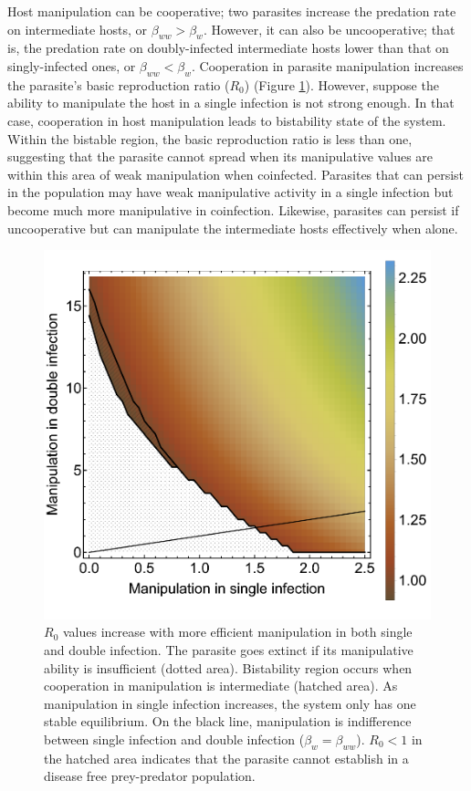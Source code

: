 \documentclass[11pt]{article}
\begin{document}
Host manipulation can be cooperative; two parasites increase the predation rate on intermediate hosts, or $\beta_{ww} > \beta_w$. 
However, it can also be uncooperative; that is, the predation rate on doubly-infected intermediate hosts lower than that on singly-infected ones, or $\beta_{ww} < \beta_w$.
Cooperation in parasite manipulation increases the parasite's basic reproduction ratio ($R_0$) (Figure \ref{fig:manipR0}). 
However, suppose the ability to manipulate the host in a single infection is not strong enough. 
In that case, cooperation in host manipulation leads to bistability state of the system. 
Within the bistable region, the basic reproduction ratio is less than one, suggesting that the parasite cannot spread when its manipulative values are within this area of weak manipulation when coinfected. 
Parasites that can persist in the population may have weak manipulative activity in a single infection but become much more manipulative in coinfection. 
Likewise, parasites can persist if uncooperative but can manipulate the intermediate hosts effectively when alone.

\begin{figure}
\centering
\includegraphics[width=\textwidth]{Figures/manip_bifur_R0.pdf}
\caption{$R_0$ values increase with more efficient manipulation in both single and double infection. The parasite goes extinct if its manipulative ability is insufficient (dotted area). Bistability region occurs when cooperation in manipulation is intermediate (hatched area). As manipulation in single infection increases, the system only has one stable equilibrium. On the black line, manipulation is indifference between single infection and double infection ($\beta_w = \beta_{ww}$). $R_0 < 1$ in the hatched area indicates that the parasite cannot establish in a disease free prey-predator population.}
\label{fig:manipR0}
\end{figure}
\end{document}

